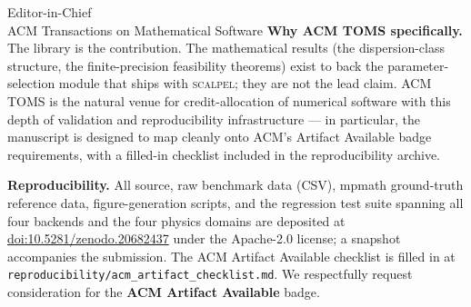 \documentclass[11pt]{letter}
\begin{document}
\begin{letter}{Editor-in-Chief \\ ACM Transactions on Mathematical Software}
\medskip\noindent\textbf{Why ACM TOMS specifically.}
The library is the contribution. The mathematical results (the dispersion-class structure, the finite-precision feasibility theorems) exist to back the parameter-selection module that ships with \textsc{scalpel}; they are not the lead claim. ACM TOMS is the natural venue for credit-allocation of numerical software with this depth of validation and reproducibility infrastructure --- in particular, the manuscript is designed to map cleanly onto ACM's Artifact Available badge requirements, with a filled-in checklist included in the reproducibility archive.

\medskip\noindent\textbf{Reproducibility.}
All source, raw benchmark data (CSV), mpmath ground-truth reference data, figure-generation scripts, and the regression test suite spanning all four backends and the four physics domains are deposited at \href{https://doi.org/10.5281/zenodo.20682437}{doi:10.5281/zenodo.20682437} under the Apache-2.0 license; a snapshot accompanies the submission. The ACM Artifact Available checklist is filled in at \texttt{reproducibility/acm\_artifact\_checklist.md}. We respectfully request consideration for the \textbf{ACM Artifact Available} badge.


\end{letter}
\end{document}
